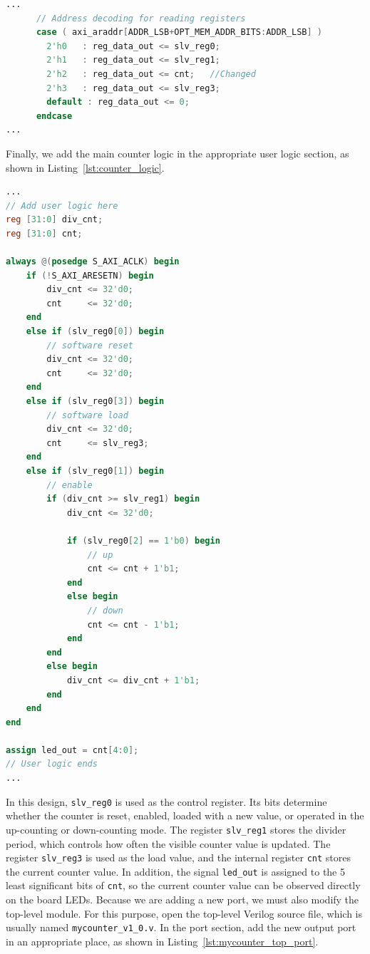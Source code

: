 \documentclass{article}
\begin{document}
\begin{lstlisting}[language=Verilog, caption={Modifying the AXI read logic to return the counter value}, label={lst:counter_read_logic}]
...
      // Address decoding for reading registers
      case ( axi_araddr[ADDR_LSB+OPT_MEM_ADDR_BITS:ADDR_LSB] )
        2'h0   : reg_data_out <= slv_reg0;
        2'h1   : reg_data_out <= slv_reg1;
        2'h2   : reg_data_out <= cnt; 	//Changed
        2'h3   : reg_data_out <= slv_reg3;
        default : reg_data_out <= 0;
      endcase
...
\end{lstlisting}

Finally, we add the main counter logic in the appropriate user logic section, as shown in Listing~\ref{lst:counter_logic}.

\begin{lstlisting}[language=Verilog, caption={User logic for the AXI-based counter with LED output}, label={lst:counter_logic}]
...
// Add user logic here
reg [31:0] div_cnt;
reg [31:0] cnt;

always @(posedge S_AXI_ACLK) begin
    if (!S_AXI_ARESETN) begin
        div_cnt <= 32'd0;
        cnt     <= 32'd0;
    end
    else if (slv_reg0[0]) begin
        // software reset
        div_cnt <= 32'd0;
        cnt     <= 32'd0;
    end
    else if (slv_reg0[3]) begin
        // software load
        div_cnt <= 32'd0;
        cnt     <= slv_reg3;
    end
    else if (slv_reg0[1]) begin
        // enable
        if (div_cnt >= slv_reg1) begin
            div_cnt <= 32'd0;

            if (slv_reg0[2] == 1'b0) begin
                // up
                cnt <= cnt + 1'b1;
            end
            else begin
                // down
                cnt <= cnt - 1'b1;
            end
        end
        else begin
            div_cnt <= div_cnt + 1'b1;
        end
    end
end

assign led_out = cnt[4:0];
// User logic ends
...
\end{lstlisting}

In this design, \texttt{slv\_reg0} is used as the control register. Its bits determine whether the counter is reset, enabled, loaded with a new value, or operated in the up-counting or down-counting mode. The register \texttt{slv\_reg1} stores the divider period, which controls how often the visible counter value is updated. The register \texttt{slv\_reg3} is used as the load value, and the internal register \texttt{cnt} stores the current counter value. In addition, the signal \texttt{led\_out} is assigned to the 5 least significant bits of \texttt{cnt}, so the current counter value can be observed directly on the board LEDs.
Because we are adding a new port, we must also modify the top-level module. For this purpose, open the top-level Verilog source file, which is usually named \texttt{mycounter\_v1\_0.v}. In the port section, add the new output port in an appropriate place, as shown in Listing~\ref{lst:mycounter_top_port}.
\end{document}
